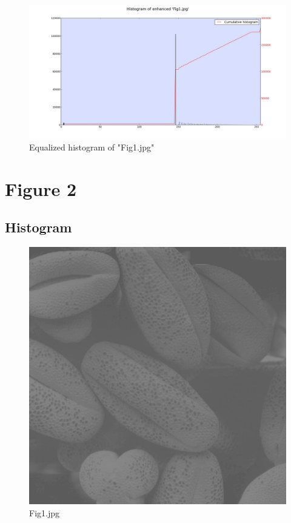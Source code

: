     \begin{figure}[h]
        \centering
        \includegraphics[width=\linewidth]{./images/Equalized_Histogram_Fig1.jpg}
        \caption{Equalized histogram of "Fig1.jpg"}
        \label{diagram:equal_hist_fig1}
    \end{figure}


\section{Figure 2}

    \subsection{Histogram}

    \begin{figure}[h]
        \centering
        \includegraphics[width=\linewidth]{./images/Fig2.jpg}
        \caption{Fig1.jpg}
        \label{diagram:fig1}
    \end{figure}


